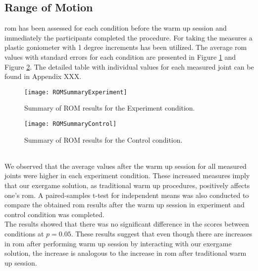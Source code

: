\subsection{Range of Motion}
\gls{rom} has been assessed  for each condition before the warm up session and immediately the participants completed the procedure. For taking the measures a plastic goniometer with 1 degree increments has been utilized. The average \acrshort{rom} values with standard errors for each condition are presented in Figure \ref{fig:romExperiment} and Figure \ref{fig:romControl}. The detailed table with individual values for each measured joint can be found in Appendix XXX.
\begin{figure}[h]
    \centering
    \texttt{[image: ROMSummaryExperiment]}
    \caption{Summary of ROM results for the Experiment condition.}
    \label{fig:romExperiment}
\end{figure}
\begin{figure}[h]
    \centering
    \texttt{[image: ROMSummaryControl]}
    \caption{Summary of ROM results for the Control condition.}
    \label{fig:romControl}
\end{figure}\\
We observed that the average values after the warm up session for all measured joints were higher in each experiment condition. These increased measures imply that our exergame solution, as traditional warm up procedures, positively affects one's \acrshort{rom}. A paired-samples t-test for independent means was also conducted to compare the obtained \acrshort{rom} results after the warm up session in experiment and control condition was completed. \\The results showed that there was no significant difference in the scores between conditions at \begin{math}p = 0.05\end{math}. These results suggest that even though there are increases in \acrshort{rom} after performing warm up session by interacting with our exergame solution, the increase is analogous to the increase in \acrshort{rom} after traditional warm up session. 
